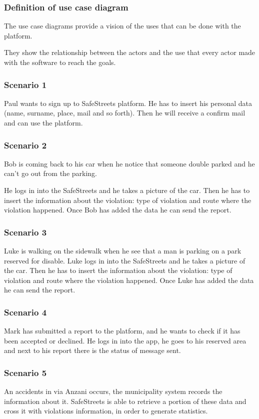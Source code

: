 \subsubsection{Definition of use case diagram}
The use case diagrams provide a vision of the uses that can be done with the platform. 

They show the relationship between the actors and the use that every actor made with the software to reach the goals.

\subsubsection{Scenario 1}
Paul wants to sign up to SafeStreets platform. He has to insert his personal data (name, surname, place, mail and so forth). Then he will receive a confirm mail and can use the platform.

\subsubsection{Scenario 2}
Bob is coming back to his car when he notice that someone double parked and he can’t go out from the parking. 

He logs in into the SafeStreets and he takes a picture of the car. Then he has to insert the information about the violation: type of violation and route where the violation happened. Once Bob has added the data he can send the report.

\subsubsection{Scenario 3}
Luke is walking on the sidewalk when he see that a man is parking on a park reserved for disable.
Luke logs in into the SafeStreets and he takes a picture of the car. Then he has to insert the information about the violation: type of violation and route where the violation happened. Once Luke has added the data he can send the report.

\subsubsection{Scenario 4}
Mark has submitted a report to the platform, and he wants to check if it has been accepted or declined.
He logs in into the app, he goes to his reserved area and next to his report there is the status of message sent.

\subsubsection{Scenario 5}
An accidents in via Anzani occurs, the municipality system records the information about it.
SafeStreets is able to retrieve a portion of these data and cross it with violations information, in order to generate statistics.

